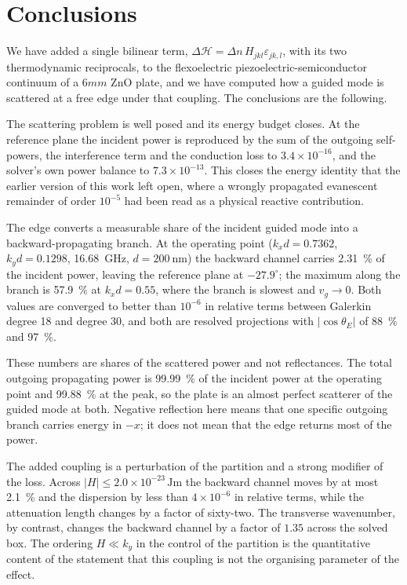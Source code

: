 \section{Conclusions}
\label{sec:conclusions}

We have added a single bilinear term, $\Delta\mathcal{H}=\Delta n\,H_{jkl}
\varepsilon_{jk,l}$, with its two thermodynamic reciprocals, to the
flexoelectric piezoelectric-semiconductor continuum of a $6mm$ ZnO plate, and we
have computed how a guided mode is scattered at a free edge under that coupling.
The conclusions are the following.

The scattering problem is well posed and its energy budget closes.  At the
reference plane the incident power is reproduced by the sum of the outgoing
self-powers, the interference term and the conduction loss to
$3.4\times10^{-16}$, and the solver's own power balance to
$7.3\times10^{-13}$.  This closes the energy identity that the earlier version
of this work left open, where a wrongly propagated evanescent remainder of order
$10^{-5}$ had been read as a physical reactive contribution.

The edge converts a measurable share of the incident guided mode into a
backward-propagating branch.  At the operating point
($k_xd=0.7362$, $k_yd=0.1298$, \SI{16.68}{\giga\hertz},
$d=\SI{200}{\nano\metre}$) the backward channel carries \SI{2.31}{\percent} of
the incident power, leaving the reference plane at
$-27.9^{\circ}$; the maximum along the branch is
\SI{57.9}{\percent} at $k_xd=0.55$, where the branch is slowest and
$v_g\to0$.  Both values are converged to better than $10^{-6}$ in relative terms
between Galerkin degree 18 and degree 30, and both are resolved projections with
$|\cos\theta_E|$ of \SI{88}{\percent} and \SI{97}{\percent}.

These numbers are shares of the scattered power and not reflectances.  The
total outgoing propagating power is \SI{99.99}{\percent} of the incident power
at the operating point and \SI{99.88}{\percent} at the peak, so the plate is an
almost perfect scatterer of the guided mode at both.  Negative reflection here
means that one specific outgoing branch carries energy in $-x$; it does not
mean that the edge returns most of the power.

The added coupling is a perturbation of the partition and a strong modifier of
the loss.  Across $|H|\le2.0\times10^{-23}\,\si{\joule\metre}$ the backward
channel moves by at most \SI{2.1}{\percent} and the dispersion by less than
$4\times10^{-6}$ in relative terms, while the attenuation length changes by a
factor of sixty-two.  The transverse wavenumber, by contrast, changes the
backward channel by a factor of $1.35$ across the solved box.  The ordering
$H\ll k_y$ in the control of the partition is the quantitative content of the
statement that this coupling is not the organising parameter of the effect.

